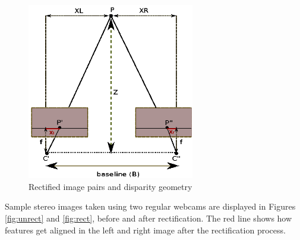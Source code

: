 \begin{figure}[!h]
\centering
\includegraphics[width=0.65\textwidth, trim=20mm 0mm 0mm 150mm,clip]{rectdisp}
\caption{Rectified image pairs and disparity geometry}
\label{fig:rectify}
\end{figure} 

Sample stereo images taken using two regular webcams are displayed in Figures \ref{fig:unrect} and \ref{fig:rect},
before and after rectification. 
The red line shows how features get aligned in the left and right image after the rectification process.

